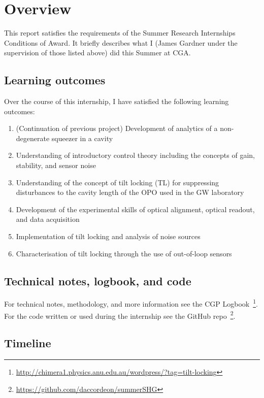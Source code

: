 \documentclass[aps,pra,superscriptaddress,reprint,nofootinbib]{revtex4-1}
\begin{document}
\section{Overview}

This report satisfies the requirements of the Summer Research Internships Conditions of Award. It briefly describes what I (James Gardner under the supervision of those listed above) did this Summer at CGA.

\subsection{Learning outcomes}

Over the course of this internship, I have satisfied the following learning outcomes:
\begin{enumerate}
\item (Continuation of previous project) Development of analytics of a non-degenerate squeezer in a cavity 
\item Understanding of introductory control theory including the concepts of gain, stability, and sensor noise
\item Understanding of the concept of tilt locking (TL) for suppressing disturbances to the cavity length of the OPO used in the GW laboratory
\item Development of the experimental skills of optical alignment, optical readout, and data acquisition
\item Implementation of tilt locking and analysis of noise sources
\item Characterisation of tilt locking through the use of out-of-loop sensors
\end{enumerate}

\subsection{Technical notes, logbook, and code}

For technical notes, methodology, and more information see the CGP Logbook~\footnote{\url{http://chimera1.physics.anu.edu.au/wordpress/?tag=tilt-locking}}. For the code written or used during the internship see the GitHub repo~\footnote{\url{https://github.com/daccordeon/summerSHG}}.

\subsection{Timeline}
\end{document}
